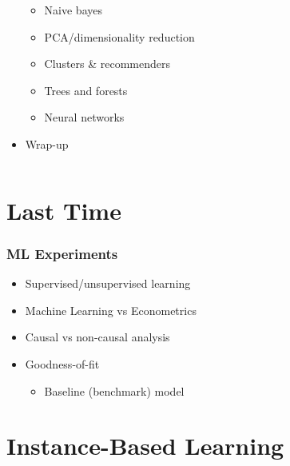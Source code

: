 \documentclass[mathserif, xcolor=table, svgnames]{beamer}
\begin{document}
\begin{frame}
\begin{columns}
\begin{column}{0.5\linewidth}
\begin{itemize}
      \begin{itemize}
      \item Naive bayes
      \item PCA/dimensionality reduction
      \item Clusters \& recommenders
      \item Trees and forests
      \item Neural networks
      \end{itemize}
    \item Wrap-up
    \end{itemize}
  \end{column}
\end{columns}
\end{frame}

\section{Last Time}

\begin{frame}
  \frametitle{ML Experiments}
  \begin{itemize}
  \item Supervised/unsupervised learning
  \item Machine Learning vs Econometrics
  \item Causal vs non-causal analysis
  \item Goodness-of-fit
    \begin{itemize}
    \item Baseline (benchmark) model
    \end{itemize}
  \end{itemize}
\end{frame}

\section[IBL]{Instance-Based Learning}
\frame{\tableofcontents[currentsection]}

{

}
\end{document}
